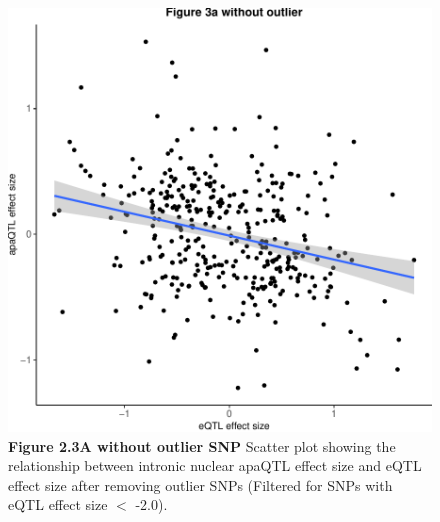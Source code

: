 \begin{figure}[!htb]
\centering
\includegraphics[width=5in]{img/ch02/Fig3_figuresupplement1.pdf}
\caption[Figure 2.3A without outlier SNP]{\textbf{Figure 2.3A without outlier SNP} Scatter plot showing the relationship between intronic nuclear apaQTL effect size and eQTL effect size after removing outlier SNPs (Filtered for SNPs with eQTL effect size $<$ -2.0).}
\label{fig:3anooutlier}
\end{figure}
\clearpage

